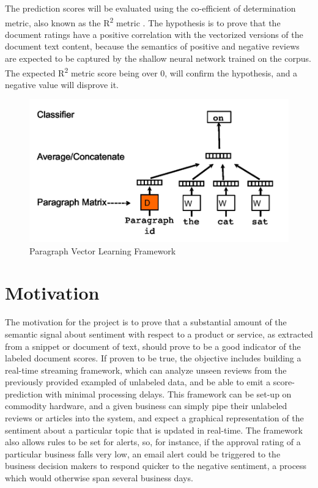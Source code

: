\documentclass[conference]{IEEEtran}
\begin{document}
The prediction scores will be evaluated using the co-efficient of determination metric, also known as the R\textsuperscript{2} metric \cite{cameron1997r}. The hypothesis is to prove that the document ratings have a positive correlation with the vectorized versions of the document text content, because the semantics of positive and negative reviews are expected to be captured by the shallow neural network trained on the corpus. The expected R\textsuperscript{2} metric score being over 0, will confirm the hypothesis, and a negative value will disprove it.

\begin{figure}[ht]
\centering
\includegraphics[width=400pt]{images/docvec_1.png}
\caption{Paragraph Vector Learning Framework\cite{mikolov2013distributed}}
\label{fig:paragraph-vector-framework}
\end{figure}

\vspace{5mm}

\section{Motivation}
The motivation for the project is to prove that a substantial amount of the semantic signal about sentiment with respect to a product or service, as extracted from a snippet or document of text, should prove to be a good indicator of the labeled document scores. If proven to be true, the objective includes building a real-time streaming framework, which can analyze unseen reviews from the previously provided exampled of unlabeled data, and be able to emit a score-prediction with minimal processing delays. This framework can be set-up on commodity hardware, and a given business can simply pipe their unlabeled reviews or articles into the system, and expect a graphical representation of the sentiment about a particular topic that is updated in real-time. The framework also allows rules to be set for alerts, so, for instance, if the approval rating of a particular business falls very low, an email alert could be triggered to the business decision makers to respond quicker to the negative sentiment, a process which would otherwise span several business days.
\end{document}
